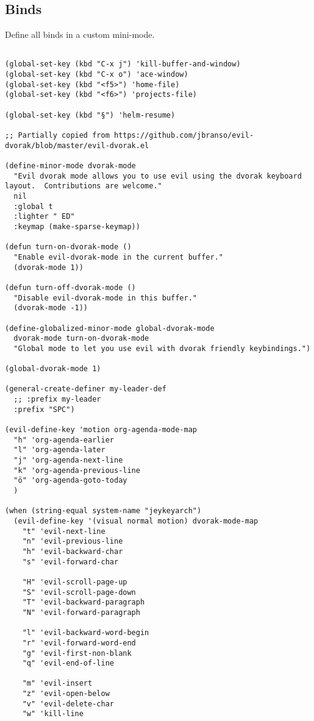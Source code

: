 \documentclass[11pt]{article}
\begin{document}
\subsection{Binds}
\label{sec:orgc0b7045}
Define all binds in a custom mini-mode.
\begin{verbatim}

(global-set-key (kbd "C-x j") 'kill-buffer-and-window)
(global-set-key (kbd "C-x o") 'ace-window)
(global-set-key (kbd "<f5>") 'home-file)
(global-set-key (kbd "<f6>") 'projects-file)

(global-set-key (kbd "§") 'helm-resume)

;; Partially copied from https://github.com/jbranso/evil-dvorak/blob/master/evil-dvorak.el

(define-minor-mode dvorak-mode
  "Evil dvorak mode allows you to use evil using the dvorak keyboard layout.  Contributions are welcome."
  nil
  :global t
  :lighter " ED"
  :keymap (make-sparse-keymap))

(defun turn-on-dvorak-mode ()
  "Enable evil-dvorak-mode in the current buffer."
  (dvorak-mode 1))

(defun turn-off-dvorak-mode ()
  "Disable evil-dvorak-mode in this buffer."
  (dvorak-mode -1))

(define-globalized-minor-mode global-dvorak-mode
  dvorak-mode turn-on-dvorak-mode
  "Global mode to let you use evil with dvorak friendly keybindings.")

(global-dvorak-mode 1)

(general-create-definer my-leader-def
  ;; :prefix my-leader
  :prefix "SPC")

(evil-define-key 'motion org-agenda-mode-map
  "h" 'org-agenda-earlier
  "l" 'org-agenda-later
  "j" 'org-agenda-next-line
  "k" 'org-agenda-previous-line
  "ö" 'org-agenda-goto-today
  )

(when (string-equal system-name "jeykeyarch")
  (evil-define-key '(visual normal motion) dvorak-mode-map
    "t" 'evil-next-line
    "n" 'evil-previous-line
    "h" 'evil-backward-char
    "s" 'evil-forward-char

    "H" 'evil-scroll-page-up
    "S" 'evil-scroll-page-down
    "T" 'evil-backward-paragraph
    "N" 'evil-forward-paragraph

    "l" 'evil-backward-word-begin
    "r" 'evil-forward-word-end
    "g" 'evil-first-non-blank
    "q" 'evil-end-of-line

    "m" 'evil-insert
    "z" 'evil-open-below
    "v" 'evil-delete-char
    "w" 'kill-line


\end{verbatim}
\end{document}
